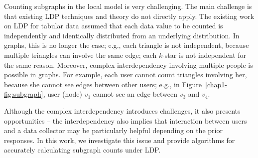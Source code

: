 Counting subgraphs in the local model is very challenging. 
The main challenge is that existing LDP techniques and theory do not directly apply. 
The existing work on LDP for tabular data assumed that 
each data value to be counted 
is independently and identically distributed from an underlying distribution. 
In graphs, this is no longer the case; e.g., 
each triangle is not independent, because multiple triangles can involve the same edge; 
each $k$-star is not independent for the same reason. 
Moreover, complex interdependency involving multiple people is possible in graphs. 
For example, each user cannot count triangles involving her, because she cannot see edges between other users; 
e.g., in Figure~\ref{chap1-fig:subgraph}, user (node) $v_1$ cannot see an edge between $v_3$ and $v_4$. 

Although the complex interdependency introduces challenges, it also presents opportunities -- the interdependency also implies that interaction between users and a data collector may be particularly helpful depending on the prior responses. 
In this work, we investigate this issue and provide algorithms for accurately calculating subgraph counts under LDP. 

